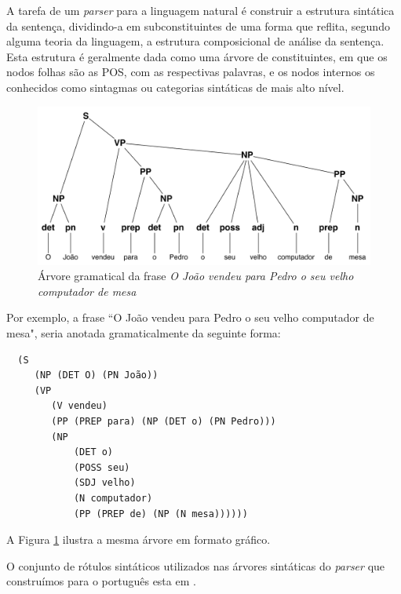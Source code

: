 A tarefa de um \emph{parser} para a linguagem natural é construir a estrutura sintática da sentença, dividindo-a em subconstituintes de uma forma que reflita, segundo alguma teoria da linguagem, a estrutura composicional de análise da sentença. Esta estrutura é geralmente dada como uma árvore de constituintes, em que os nodos folhas são as POS, com as respectivas palavras, e os nodos internos os conhecidos como sintagmas ou categorias sintáticas de mais alto nível.

\begin{figure}
	\begin{center}
		\includegraphics[scale=0.5]{tree.pdf}
		\caption{\label{tree} Árvore gramatical da frase \emph{O João vendeu para Pedro o seu velho computador de mesa}}

	\end{center}
\end{figure}

Por exemplo, a frase ``O João vendeu para Pedro o seu velho computador de mesa", seria anotada gramaticalmente da seguinte forma:

\begin{verbatim}
  (S
     (NP (DET O) (PN João))
     (VP
        (V vendeu)
        (PP (PREP para) (NP (DET o) (PN Pedro)))
        (NP
            (DET o)
            (POSS seu)
            (SDJ velho)
            (N computador)
            (PP (PREP de) (NP (N mesa))))))
\end{verbatim}

			
A Figura \ref{tree} ilustra a mesma árvore em formato gráfico.

O conjunto de rótulos sintáticos utilizados nas árvores sintáticas do \emph{parser} que construímos para o português esta em \cite{florestasintatica}.




